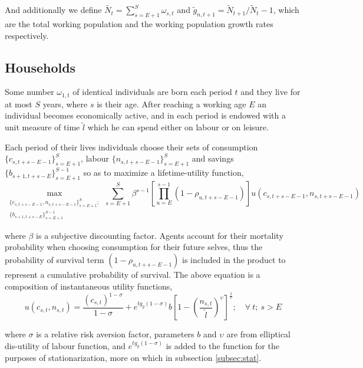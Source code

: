 And additionally we define $\tilde{N_t} = \sum^S_{s=E+1}\omega_{s,t}$ and
$\tilde{g}_{n,t+1} = \tilde{N}_{t+1}/\tilde{N}_t -1$, which are the total working population and the working population growth rates respectively.

\subsection{Households}
\label{subsec:households}
Some number $\omega_{1, t}$ of identical individuals are born each period $t$ and they live for at most $S$ years, where $s$ is their age. After reaching a working age $E$ an individual becomes economically active, and in each period is endowed with a unit measure of time $\tilde{l}$ which he can spend either on labour or on leisure.

Each period of their lives individuals choose their sets of consumption \\ $\{c_{s,t+s-E-1}\}^S_{s=E+1}$, labour $\{n_{s,t+s-E-1}\}^S_{s=E+1}$ and savings $\{b_{s+1,t+s-E}\}^{S-1}_{s=E+1}$ so as to maximize a lifetime-utility function,
\begin{equation}\label{eq:maximization_problem}
    \max_{\substack{
      \{c_{s,t+s-E-1}, n_{s,t+s-E-1}\}_{s=E+1}^S; \\
      \{b_{s+1,t+s-E}\}_{s=E+1}^{S-1}
      }}
    \sum^S_{s=E+1} \beta^{s-1} \left[ {\scriptstyle\prod}^{s-1}_{u=E} (1-\rho_{u, t+s-E-1})\right] u(c_{s, t+s-E-1}, n_{s, t+s-E-1})
\end{equation}

\noindent where $\beta$ is a subjective discounting factor. Agents account for their mortality probability when choosing consumption for their future selves, thus the probability of survival term $(1-\rho_{u, t+s-E-1})$ is included in the product to represent a cumulative probability of survival.
The above equation is a composition of instantaneous utility functions,
\begin{equation}\label{eq:utility_function}
    u(c_{s,t}, n_{s,t})=\frac{(c_{s,t})^{1-\sigma}}{1-\sigma}+e^{tg_y(1-\sigma)} b \left[ 1 - \left(\frac{n_{s,t}}{\tilde{l}}\right)^\upsilon \right]^{\frac{1}{\upsilon}}; \quad \forall \ t;\ s>E
\end{equation}

\noindent where $\sigma$ is a relative risk aversion factor, parameters $b$ and $\upsilon$ are from elliptical dis-utility of labour function, and $e^{tg_y(1-\sigma)}$ is added to the function for the purposes of stationarization, more on which in subsection \textcolor{Fuchsia}{\ref{subsec:stat}}.

